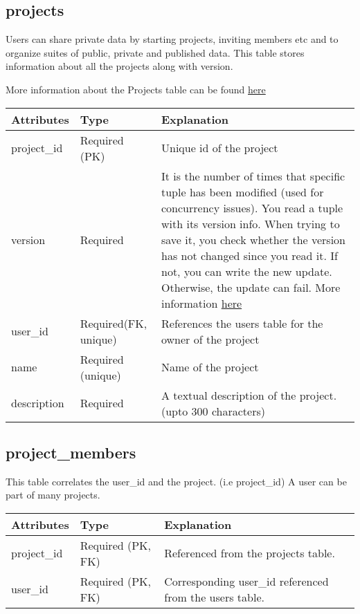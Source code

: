\documentclass[letterpaper,10pt,english]{sphinxmanual}
\begin{document}
\subsection{projects}
\label{Table_Description:projects}
Users can share private data by starting projects, inviting members etc and to organize suites of public, private and published data. This table stores information about all the projects along with version.

More information about the Projects table can be found \href{http://wiki.cs.rpi.edu/trac/metpetdb/wiki/Projects}{here}

\begin{tabulary}{\linewidth}{|L|L|L|}
\hline
\textbf{
Attributes
} & \textbf{
Type
} & \textbf{
Explanation
}\\\hline

project\_id
 & 
Required (PK)
 & 
Unique id of the project
\\\hline

version
 & 
Required
 & 
It is the number of times that specific tuple has been modified
(used for concurrency issues). You read a tuple with its version info.
When trying to save it, you check whether the version has not changed
since you read it. If not, you can write the new update. Otherwise,
the update can fail. More information \href{http://wiki.cs.rpi.edu/trac/metpetdb/wiki/Versioning}{here}
\\\hline

user\_id
 & 
Required(FK, unique)
 & 
References the users table for the owner of the
project
\\\hline

name
 & 
Required (unique)
 & 
Name of the project
\\\hline

description
 & 
Required
 & 
A textual description of the project. (upto 300 characters)
\\\hline
\end{tabulary}



\subsection{project\_members}
\label{Table_Description:project-members}
This table correlates the user\_id and the project. (i.e project\_id)
A user can be part of many projects.

\begin{tabulary}{\linewidth}{|L|L|L|}
\hline
\textbf{
Attributes
} & \textbf{
Type
} & \textbf{
Explanation
}\\\hline

project\_id
 & 
Required (PK, FK)
 & 
Referenced from the projects table.
\\\hline

user\_id
 & 
Required (PK, FK)
 & 
Corresponding user\_id referenced from the users table.
\\\hline
\end{tabulary}
\end{document}
